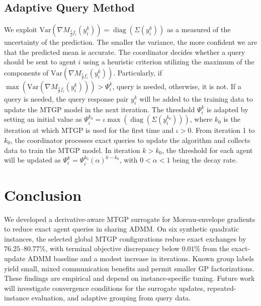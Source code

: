\documentclass[conference]{IEEEtran}
\DeclareMathOperator{\diag}{diag}
\begin{document}


\subsection{Adaptive Query Method}
\label{sec:query_method}

 We exploit $\mathrm{Var}(\nabla M_{\frac{1}{\rho}f_i}(y_i^k)) = \diag(\Sigma (y_i^k))$ as a measured of the uncertainty of the prediction. The smaller the variance, the more confident we are that the predicted mean is accurate. The coordinator decides whether a query should be sent to agent $i$ using a heuristic criterion utilizing the maximum of the components of $\mathrm{Var}(\nabla M_{\frac{1}{\rho}f_i}(y_i^k))$. Particularly, if $\max(\mathrm{Var}(\nabla M_{\frac{1}{\rho}f_i}(y_i^k))) > \Psi_i^k$, query is needed, otherwise, it is not. If a query is needed, the query response pair $y_i^k$ will be added to the training data to update the MTGP model in the next iteration. The threshold $\Psi_i^k$ is adapted by setting an initial value as $\Psi_i^{k_0} = \iota \max(\diag(\Sigma (y_i^{k_0})))$, where $k_0$ is the iteration at which MTGP is used for the first time and $\iota>0$. From iteration 1 to $k_0$, the coordinator processes exact queries to update the algorithm and collects data to train the MTGP model. In iteration $k > k_0$, the threshold for each agent will be updated as $\Psi_i^k = \Psi_i^{k_0}(\alpha)^{k-k_0}$, with $0< \alpha < 1$ being the decay rate.






\section{Conclusion}
\label{sec:conclusion}
We developed a derivative-aware MTGP surrogate for Moreau-envelope gradients to reduce exact agent queries in sharing ADMM. On six synthetic quadratic instances, the selected global MTGP configurations reduce exact exchanges by $76.25$--$80.77\%$, with terminal objective discrepancy below $0.01\%$ from the exact-update ADMM baseline and a modest increase in iterations. Known group labels yield small, mixed communication benefits and permit smaller GP factorizations. These findings are empirical and depend on instance-specific tuning. Future work will investigate convergence conditions for the surrogate updates, repeated-instance evaluation, and adaptive grouping from query data.



\end{document}
